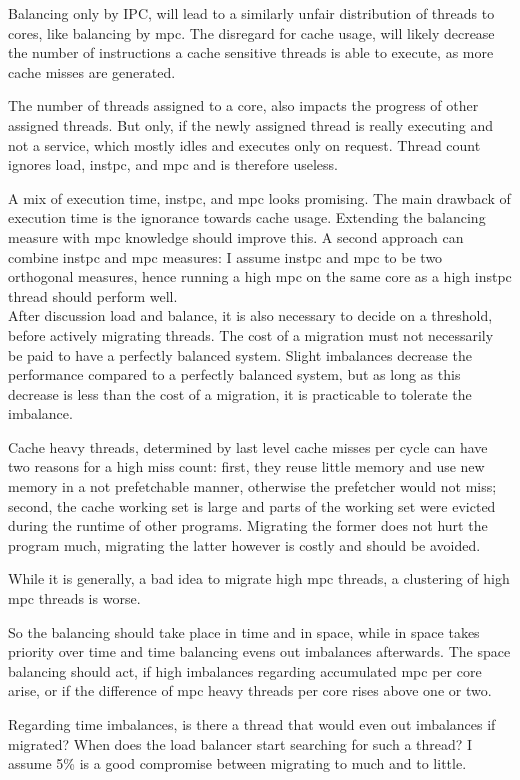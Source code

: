 Balancing only by IPC, will lead to a similarly unfair distribution of threads
to cores, like balancing by \gls{mpc}.
The disregard for cache usage, will likely decrease the number of instructions
a cache sensitive threads is able to execute, as more cache misses are
generated.

The number of threads assigned to a core, also impacts the progress of other
assigned threads.
But only, if the newly assigned thread is really executing and not a service,
which mostly idles and executes only on request.
Thread count ignores load, \gls{instpc}, and \gls{mpc} and is therefore
useless.

A mix of execution time, \gls{instpc}, and \gls{mpc} looks promising.
The main drawback of execution time is the ignorance towards cache usage.
Extending the balancing measure with \gls{mpc} knowledge should improve this.
A second approach can combine \gls{instpc} and \gls{mpc} measures: I assume
\gls{instpc} and \gls{mpc} to be two orthogonal measures, hence running a
high \gls{mpc} on the same core as a high \gls{instpc} thread should perform
well.
\\


After discussion load and balance, it is also necessary to decide on a
threshold, before actively migrating threads.
The cost of a migration must not necessarily be paid to have a perfectly
balanced system.
Slight imbalances decrease the performance compared to a perfectly balanced
system, but as long as this decrease is less than the cost of a migration,
it is practicable to tolerate the imbalance.

Cache heavy threads, determined by last level cache misses per cycle can have
two reasons for a high miss count: first, they reuse little memory and use new
memory in a not prefetchable manner, otherwise the prefetcher would not miss;
second, the cache working set is large and parts of the working set were
evicted during the runtime of other programs.
Migrating the former does not hurt the program much, migrating the latter
however is costly and should be avoided.

While it is generally, a bad idea to migrate high \gls{mpc} threads, a
clustering of high \gls{mpc} threads is worse.

So the balancing should take place in time and in space, while in space takes
priority over time and time balancing evens out imbalances afterwards.
The space balancing should act, if high imbalances regarding accumulated
\gls{mpc} per core arise, or if the difference of \gls{mpc} heavy threads per
core rises above one or two.

Regarding time imbalances, is there a thread that would even out imbalances if
migrated? When does the load balancer start searching for such a thread?
I assume 5\% is a good compromise between migrating to much and to little.
